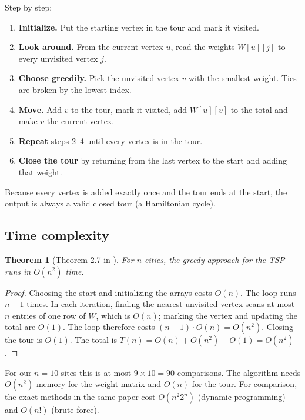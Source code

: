 \documentclass[11pt,a4paper]{article}
\newtheorem{theorem}{Theorem}
\begin{document}
Step by step:
\begin{enumerate}[noitemsep]
  \item \textbf{Initialize.} Put the starting vertex in the tour and mark it visited.
  \item \textbf{Look around.} From the current vertex $u$, read the weights $W[u][j]$ to every unvisited vertex $j$.
  \item \textbf{Choose greedily.} Pick the unvisited vertex $v$ with the smallest weight. Ties are broken by the lowest index.
  \item \textbf{Move.} Add $v$ to the tour, mark it visited, add $W[u][v]$ to the total and make $v$ the current vertex.
  \item \textbf{Repeat} steps 2--4 until every vertex is in the tour.
  \item \textbf{Close the tour} by returning from the last vertex to the start and adding that weight.
\end{enumerate}
Because every vertex is added exactly once and the tour ends at the start, the output is always a valid closed tour (a Hamiltonian cycle).

\subsection{Time complexity}
\begin{theorem}[Theorem 2.7 in \cite{luna2024}]
For $n$ cities, the greedy approach for the TSP runs in $O(n^2)$ time.
\end{theorem}
\begin{proof}
Choosing the start and initializing the arrays costs $O(n)$. The loop runs $n-1$ times. In each iteration, finding the nearest unvisited vertex scans at most $n$ entries of one row of $W$, which is $O(n)$; marking the vertex and updating the total are $O(1)$. The loop therefore costs $(n-1)\cdot O(n) = O(n^2)$. Closing the tour is $O(1)$. The total is $T(n) = O(n) + O(n^2) + O(1) = O(n^2)$.
\end{proof}
\noindent For our $n = 10$ sites this is at most $9 \times 10 = 90$ comparisons. The algorithm needs $O(n^2)$ memory for the weight matrix and $O(n)$ for the tour. For comparison, the exact methods in the same paper cost $O(n^2 2^n)$ (dynamic programming) and $O(n!)$ (brute force).
\end{document}
